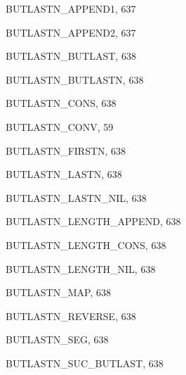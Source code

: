 \begin{theindex}
  \item {\ptt BUTLASTN\_APPEND1}, 637
  \item {\ptt BUTLASTN\_APPEND2}, 637
  \item {\ptt BUTLASTN\_BUTLAST}, 638
  \item {\ptt BUTLASTN\_BUTLASTN}, 638
  \item {\ptt BUTLASTN\_CONS}, 638
  \item {\ptt BUTLASTN\_CONV}, 59
  \item {\ptt BUTLASTN\_FIRSTN}, 638
  \item {\ptt BUTLASTN\_LASTN}, 638
  \item {\ptt BUTLASTN\_LASTN\_NIL}, 638
  \item {\ptt BUTLASTN\_LENGTH\_APPEND}, 638
  \item {\ptt BUTLASTN\_LENGTH\_CONS}, 638
  \item {\ptt BUTLASTN\_LENGTH\_NIL}, 638
  \item {\ptt BUTLASTN\_MAP}, 638
  \item {\ptt BUTLASTN\_REVERSE}, 638
  \item {\ptt BUTLASTN\_SEG}, 638
  \item {\ptt BUTLASTN\_SUC\_BUTLAST}, 638

  \indexspace


\end{theindex}
